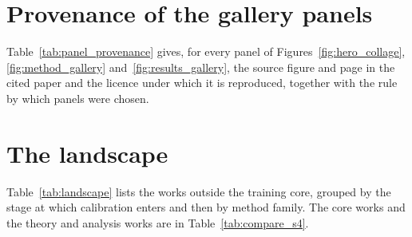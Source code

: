 \clearpage
\section{Provenance of the gallery panels}
\renewcommand{\thetable}{E\arabic{table}}\setcounter{table}{0}   %
\label{app:provenance}

Table~\ref{tab:panel_provenance} gives, for every panel of Figures~\ref{fig:hero_collage},
\ref{fig:method_gallery} and~\ref{fig:results_gallery}, the source figure and page in the cited paper and
the licence under which it is reproduced, together with the rule by which panels were chosen.



\clearpage
\section{The landscape}
\renewcommand{\thetable}{F\arabic{table}}\setcounter{table}{0}   %
\label{app:landscape}

Table~\ref{tab:landscape} lists the \nLandscape works outside the training core, grouped by the stage at
which calibration enters and then by method family. The \nCore core works and the \nTheory theory and
analysis works are in Table~\ref{tab:compare_s4}.


